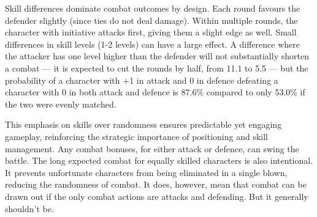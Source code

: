 
Skill differences dominate combat outcomes by design. Each round favours the defender slightly (since ties do not deal damage). Within multiple rounds, the character with initiative attacks first, giving them a slight edge as well. Small differences in skill levels (1-2 levels) can have a large effect. A difference where the attacker has one level higher than the defender will not substantially shorten a combat --- it is expected to cut the rounds by half, from 11.1 to 5.5 --- but the probability of a character with +1 in attack and 0 in defence defeating a character with 0 in both attack and defence is 87.6\% compared to only 53.0\% if the two were evenly matched.

This emphasis on skills over randomness ensures predictable yet engaging gameplay, reinforcing the strategic importance of positioning and skill management. Any combat bonuses, for either attack or defence, can swing the battle. The long expected combat for equally skilled characters is also intentional. It prevents unfortunate characters from being eliminated in a single blown, reducing the randomness of combat. It does, however, mean that combat can be drawn out if the only combat actions are attacks and defending. But it generally shouldn't be.



